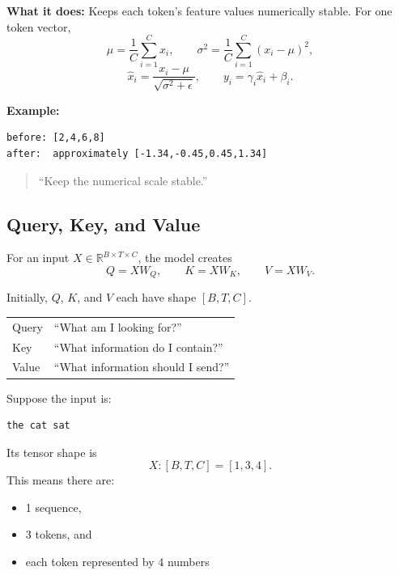 \textbf{What it does:} Keeps each token's feature values numerically stable.
For one token vector,
\[
  \mu = \frac{1}{C}\sum_{i=1}^{C}x_i,
  \qquad
  \sigma^2 = \frac{1}{C}\sum_{i=1}^{C}(x_i-\mu)^2,
\]
\[
  \widehat{x}_i = \frac{x_i-\mu}{\sqrt{\sigma^2+\epsilon}},
  \qquad
  y_i = \gamma_i\widehat{x}_i+\beta_i.
\]

\textbf{Example:}
\begin{verbatim}
before: [2,4,6,8]
after:  approximately [-1.34,-0.45,0.45,1.34]
\end{verbatim}

\begin{quote}
  ``Keep the numerical scale stable.''
\end{quote}

\subsection{Query, Key, and Value}

For an input \(X\in\mathbb{R}^{B\times T\times C}\), the model creates
\[
  Q=XW_Q, \qquad K=XW_K, \qquad V=XW_V.
\]

Initially, \(Q\), \(K\), and \(V\) each have shape \([B,T,C]\).

\begin{center}
\begin{tabular}{@{}ll@{}}
Query & ``What am I looking for?'' \\
Key   & ``What information do I contain?'' \\
Value & ``What information should I send?''
\end{tabular}
\end{center}

Suppose the input is:
\begin{verbatim}
the cat sat
\end{verbatim}

Its tensor shape is
\[
  X:[B,T,C]=[1,3,4].
\]
This means there are:
\begin{itemize}
  \setlength{\itemsep}{0pt}
  \setlength{\parsep}{0pt}
  \item 1 sequence,
  \item 3 tokens, and
  \item each token represented by 4 numbers
\end{itemize}

